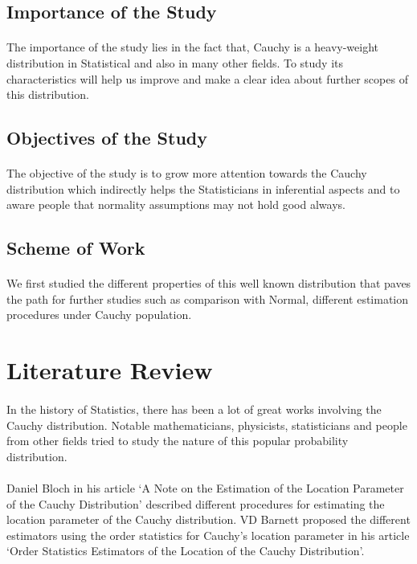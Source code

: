 \documentclass[12pt, fleqn, a4paper]{article}
\begin{document}
	\subsection{Importance of the Study}
	\paragraph{} The importance of the study lies in the fact that, Cauchy is a heavy-weight distribution in Statistical and also in many other fields. To study its characteristics will help us improve and make a clear idea about further scopes of this distribution. 
	
	\subsection{Objectives of the Study}
	\paragraph{} The objective of the study is to grow more attention towards the Cauchy distribution which indirectly helps the Statisticians in inferential aspects and to aware people that normality assumptions may not hold good always.

	\subsection{Scheme of Work}
	\paragraph{} We first studied the different properties of this well known distribution that paves the path for further studies such as comparison with Normal, different estimation procedures under Cauchy population. 
	
	\section{Literature Review}
	\paragraph{} In the history of Statistics, there has been a lot of great works involving the Cauchy distribution. Notable mathematicians, physicists, statisticians and people from other fields tried to study the nature of this popular probability distribution. 
	\paragraph{} Daniel Bloch in his article `A Note on the Estimation of the Location Parameter of the Cauchy Distribution' described different procedures for estimating the location parameter of the Cauchy distribution. VD Barnett proposed the different estimators using the order statistics for Cauchy's location parameter in his article `Order Statistics Estimators of the Location of the Cauchy Distribution'.
	
\end{document}
